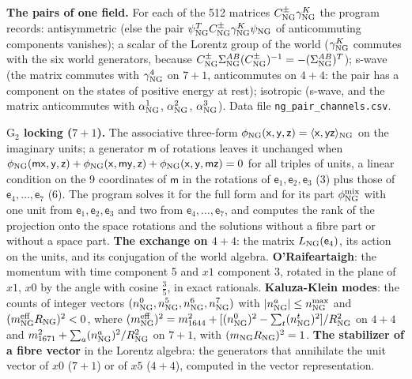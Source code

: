 \documentclass[
  10pt,
]{article}
\begin{document}
\textbf{The pairs of one field.} For each of the 512 matrices
\(C^\pm_{\rm NG}\gamma^K_{\rm NG}\) the program records: antisymmetric
(else the pair
\(\psi^T_{\rm NG}C^\pm_{\rm NG}\gamma^K_{\rm NG}\psi_{\rm NG}\) of
anticommuting components vanishes); a scalar of the Lorentz group of the
world (\(\gamma^K_{\rm NG}\) commutes with the six world generators,
because
\(C^\pm_{\rm NG}\Sigma^{AB}_{\rm NG}(C^\pm_{\rm NG})^{-1}=-(\Sigma^{AB}_{\rm NG})^T\));
s-wave (the matrix commutes with \(\gamma^4_{\rm NG}\) on \(7+1\),
anticommutes on \(4+4\): the pair has a component on the states of
positive energy at rest); isotropic (s-wave, and the matrix anticommutes
with \(\alpha^1_{\rm NG}\), \(\alpha^2_{\rm NG}\),
\(\alpha^3_{\rm NG}\)). Data file \texttt{ng\_pair\_channels.csv}.

\textbf{\(\mathrm G_2\) locking (\(7+1\)).} The associative three-form
\(\phi_{\rm NG}(\mathsf x,\mathsf y,\mathsf z)=\langle\mathsf x,\mathsf y\mathsf z\rangle_{\rm NG}\)
on the imaginary units; a generator \(\mathsf m\) of rotations leaves it
unchanged when
\(\phi_{\rm NG}(\mathsf m\mathsf x,\mathsf y,\mathsf z)+\phi_{\rm NG}(\mathsf x,\mathsf m\mathsf y,\mathsf z)+\phi_{\rm NG}(\mathsf x,\mathsf y,\mathsf m\mathsf z)=0\)
for all triples of units, a linear condition on the 9 coordinates of
\(\mathsf m\) in the rotations of
\(\mathsf e_1,\mathsf e_2,\mathsf e_3\) (3) plus those of
\(\mathsf e_4,\dots,\mathsf e_7\) (6). The program solves it for the
full form and for its part \(\phi^{\rm mix}_{\rm NG}\) with one unit
from \(\mathsf e_1,\mathsf e_2,\mathsf e_3\) and two from
\(\mathsf e_4,\dots,\mathsf e_7\), and computes the rank of the
projection onto the space rotations and the solutions without a fibre
part or without a space part. \textbf{The exchange on \(4+4\)}: the
matrix \(L_{\rm NG}(\mathsf e_4)\), its action on the units, and its
conjugation of the world algebra. \textbf{O'Raifeartaigh}: the momentum
with time component 5 and \(x1\) component 3, rotated in the plane of
\(x1\), \(x0\) by the angle with cosine \(\tfrac35\), in exact
rationals. \textbf{Kaluza-Klein modes}: the counts of integer vectors
\((n^0_{\rm NG},n^5_{\rm NG},n^6_{\rm NG},n^7_{\rm NG})\) with
\(\lvert n^a_{\rm NG}\rvert\le n^{\max}_{\rm NG}\) and
\((m^{\rm eff}_{\rm NG}R_{\rm NG})^2<0\), where
\((m^{\rm eff}_{\rm NG})^2=m_{1644}^2+[(n^0_{\rm NG})^2-\sum_t(n^t_{\rm NG})^2]/R_{\rm NG}^2\)
on \(4+4\) and \(m_{1671}^2+\sum_a(n^a_{\rm NG})^2/R_{\rm NG}^2\) on
\(7+1\), with \((m_{\rm NG}R_{\rm NG})^2=1\). \textbf{The stabilizer of
a fibre vector} in the Lorentz algebra: the generators that annihilate
the unit vector of \(x0\) (\(7+1\)) or of \(x5\) (\(4+4\)), computed in
the vector representation.
\end{document}
